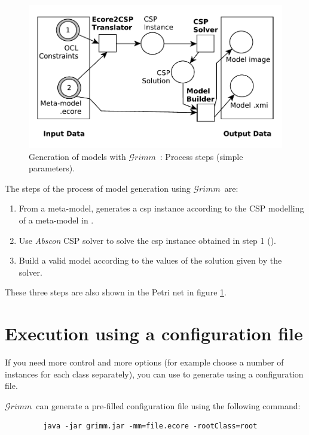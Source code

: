 \documentclass[12pt]{article} %
\newcommand{\grimm}{$\mathcal{G}rimm$\ }
\begin{document}
\begin{figure}[!h]
\centering
\includegraphics[scale=0.8]{precess_rdp2015EN.pdf}
\caption{Generation of models with \grimm: Process steps (simple parameters).}
\label{test1}
\end{figure} 

The steps of the process of model generation using \grimm are:

\begin{enumerate}
\item From a meta-model, generates a csp instance according to the CSP modelling of a meta-model in \cite{ferdjoukh}.
\item Use \textit{Abscon} CSP solver to solve the csp instance obtained in step 1 (\cite{abscon}).
\item Build a valid model according to the values of the solution given by the solver.
\end{enumerate}
 
These three steps are also shown in the Petri net in figure \ref{test1}. 
 
\section{Execution using a configuration file}

If you need more control and more options (for example choose a number of instances for each class separately), you can use to generate using a configuration file.

\grimm can generate a pre-filled configuration file using the following command:

\begin{verbatim}
         java -jar grimm.jar -mm=file.ecore -rootClass=root
\end{verbatim}
\end{document}
